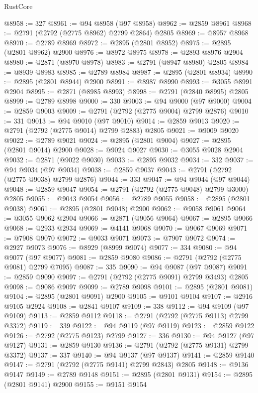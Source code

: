 \begin{lexlean}{RustCore}
\begin{coremodule}
@8958 := 327
@8961 := @94 @8958 (@97 @8958)
@8962 := @2859 @8961
@8968 := @2791 (@2792 (@2775 @8962) @2799 @2864) @2805
@8969 := @8957 @8968
@8970 := @2789 @8969
@8972 := @2895 (@2801 @8952)
@8975 := @2895 (@2801 @8962) @2900
@8976 := @8972 @8975
@8978 := @2893 @8976 @2904
@8980 := @2871 (@8970 @8978)
@8983 := @2791 (@8947 @8980) @2805
@8984 := @8939 @8983
@8985 := @2789 @8984
@8987 := @2895 (@2801 @8934)
@8990 := @2895 (@2801 @8944) @2900
@8991 := @8987 @8990
@8993 := @3055 @8991 @2904
@8995 := @2871 (@8985 @8993)
@8998 := @2791 (@2840 @8995) @2805
@8999 := @2789 @8998
@9000 := 330
@9003 := @94 @9000 (@97 @9000)
@9004 := @2859 @9003
@9009 := @2791 (@2792 (@2775 @9004) @2799 @2876)
@9010 := 331
@9013 := @94 @9010 (@97 @9010)
@9014 := @2859 @9013
@9020 := @2791 (@2792 (@2775 @9014) @2799 @2883) @2805
@9021 := @9009 @9020
@9022 := @2789 @9021
@9024 := @2895 (@2801 @9004)
@9027 := @2895 (@2801 @9014) @2900
@9028 := @9024 @9027
@9030 := @3055 @9028 @2904
@9032 := @2871 (@9022 @9030)
@9033 := @2895 @9032
@9034 := 332
@9037 := @94 @9034 (@97 @9034)
@9038 := @2859 @9037
@9043 := @2791 (@2792 (@2775 @9038) @2799 @2876)
@9044 := 333
@9047 := @94 @9044 (@97 @9044)
@9048 := @2859 @9047
@9054 := @2791 (@2792 (@2775 @9048) @2799 @3000) @2805
@9055 := @9043 @9054
@9056 := @2789 @9055
@9058 := @2895 (@2801 @9038)
@9061 := @2895 (@2801 @9048) @2900
@9062 := @9058 @9061
@9064 := @3055 @9062 @2904
@9066 := @2871 (@9056 @9064)
@9067 := @2895 @9066
@9068 := @2933 @2934
@9069 := @4141 @9068
@9070 := @9067 @9069
@9071 := @7908 @9070
@9072 := @9033 @9071
@9073 := @7907 @9072
@9074 := @2927 @9073
@9076 := @8929 (@8999 @9074)
@9077 := 334
@9080 := @94 @9077 (@97 @9077)
@9081 := @2859 @9080
@9086 := @2791 (@2792 (@2775 @9081) @2799 @7095)
@9087 := 335
@9090 := @94 @9087 (@97 @9087)
@9091 := @2859 @9090
@9097 := @2791 (@2792 (@2775 @9091) @2799 @3493) @2805
@9098 := @9086 @9097
@9099 := @2789 @9098
@9101 := @2895 (@2801 @9081)
@9104 := @2895 (@2801 @9091) @2900
@9105 := @9101 @9104
@9107 := @2916 @9105 @2924
@9108 := @2841 @9107
@9109 := 338
@9112 := @94 @9109 (@97 @9109)
@9113 := @2859 @9112
@9118 := @2791 (@2792 (@2775 @9113) @2799 @3372)
@9119 := 339
@9122 := @94 @9119 (@97 @9119)
@9123 := @2859 @9122
@9126 := @2792 (@2775 @9123) @2799
@9127 := 336
@9130 := @94 @9127 (@97 @9127)
@9131 := @2859 @9130
@9136 := @2791 (@2792 (@2775 @9131) @2799 @3372)
@9137 := 337
@9140 := @94 @9137 (@97 @9137)
@9141 := @2859 @9140
@9147 := @2791 (@2792 (@2775 @9141) @2799 @2843) @2805
@9148 := @9136 @9147
@9149 := @2789 @9148
@9151 := @2895 (@2801 @9131)
@9154 := @2895 (@2801 @9141) @2900
@9155 := @9151 @9154

\end{coremodule}
\end{lexlean}
